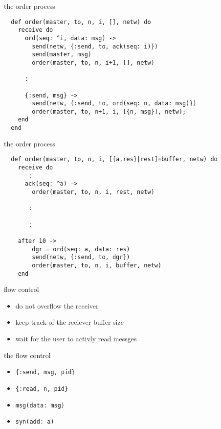 \begin{frame}[fragile]{the order process}

\begin{verbatim}
  def order(master, to, n, i, [], netw) do
    receive do
      ord(seq: ^i, data: msg) ->
        send(netw, {:send, to, ack(seq: i)})
        send(master, msg)
        order(master, to, n, i+1, [], netw)
        
      :
         
      {:send, msg} ->
        send(netw, {:send, to, ord(seq: n, data: msg)})
        order(master, to, n+1, i, [{n, msg}], netw);
    end
  end
\end{verbatim}
  
\end{frame}

\begin{frame}[fragile]{the order process}

\begin{verbatim}
  def order(master, to, n, i, [{a,res}|rest]=buffer, netw) do
    receive do
       :
      ack(seq: ^a) ->
        order(master, to, n, i, rest, netw)

       :

       :
                
    after 10 ->
        dgr = ord(seq: a, data: res)
        send(netw, {:send, to, dgr})
        order(master, to, n, i, buffer, netw)
    end
\end{verbatim}
\end{frame}

\begin{frame}{flow control}

 \begin{itemize}
  \item do not overflow the receiver \pause
  \item keep track of the reciever buffer size  \pause
  \item wait for the user to activly read messges \pause
\end{itemize}

\vspace{20pt}{\em We are introducing a synchronous interface - only send if receiver prepared.}

\end{frame}

\begin{frame}{the flow control}

  \begin{itemize}
  \item {\tt \{:send, msg, pid\}} 

  \item {\tt \{:read, n, pid\}} 


  \item {\tt msg(data: msg)}

  \item {\tt syn(add: a)}

      
\end{itemize}
  
\end{frame}

